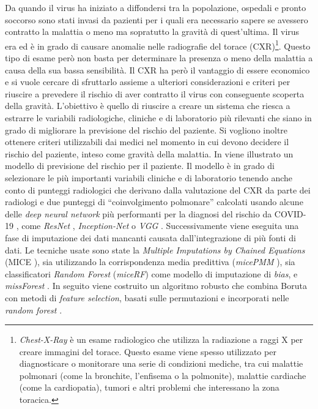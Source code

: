 \documentclass[12pt,italian]{report}
\begin{document}
	Da quando il virus ha iniziato a diffondersi tra la popolazione, ospedali e pronto soccorso sono stati invasi da pazienti per i quali era necessario sapere se avessero contratto la malattia o meno ma sopratutto la gravità di quest'ultima. Il virus era ed è in grado di causare anomalie nelle radiografie del torace (CXR)\footnote{\textit{Chest-X-Ray} è un esame radiologico che utilizza la radiazione a raggi X per creare immagini del torace. Questo esame viene spesso utilizzato per diagnosticare o monitorare una serie di condizioni mediche, tra cui malattie polmonari (come la bronchite, l'enfisema o la polmonite), malattie cardiache (come la cardiopatia), tumori e altri problemi che interessano la zona toracica.}. Questo tipo di esame però non basta per determinare la presenza o meno della malattia a causa della sua bassa sensibilità. Il CXR ha però il vantaggio di essere economico e si vuole cercare di sfruttarlo assieme a ulteriori considerazioni e criteri per riuscire a prevedere il rischio di aver contratto il virus con conseguente scoperta della gravità.
	L'obiettivo è quello di riuscire a creare un sistema che riesca a estrarre le variabili radiologiche, cliniche e di laboratorio più rilevanti che siano in grado di migliorare la previsione del rischio del paziente. Si vogliono inoltre ottenere criteri utilizzabili dai medici nel momento in cui devono decidere il rischio del paziente, inteso come gravità della malattia. In \cite{Casiraghi2020-zt} viene illustrato un modello di previsione del rischio per il paziente. Il modello è in grado di selezionare le più importanti variabili cliniche e di laboratorio tenendo anche conto di punteggi radiologici che derivano dalla valutazione del CXR da parte dei radiologi e due punteggi di ``coinvolgimento polmonare'' calcolati usando alcune delle \textit{deep neural network} più performanti per la diagnosi del rischio da COVID-19 \cite{irvin2019chexpert, ma2020survey, bressem2020comparing}, come \textit{ResNet} \cite{he2016deep, narin2021automatic}, \textit{Inception-Net} \cite{szegedy2017inception, das2020truncated} o \textit{VGG} \cite{apostolopoulos2020covid, shibly2020covid}.
	Successivamente viene eseguita una fase di imputazione dei dati mancanti causata dall'integrazione di più fonti di dati. Le tecniche usate sono state la \textit{Multiple Imputations by Chained Equations} (MICE \cite{JSSv045i03}), sia utilizzando la corrispondenza media predittiva (\textit{micePMM} \cite{gaffert2016towards}), sia classificatori \textit{Random Forest} (\textit{miceRF})  come modello di imputazione di \textit{bias}, e \textit{missForest} \cite{10.1093/bioinformatics/btr597}.
	In seguito viene costruito un algoritmo robusto che combina Boruta \cite{JSSv036i11, Kursa2010} con metodi di \textit{feature selection}, basati sulle permutazioni e incorporati nelle \textit{random forest} \cite{Strobl2007}.
	
\end{document}
